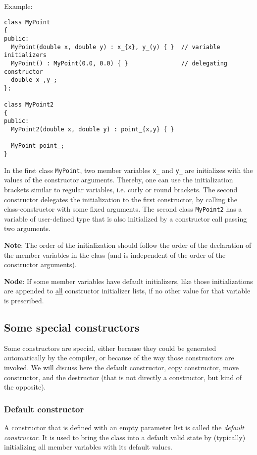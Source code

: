 Example:
\begin{verbatim}
class MyPoint
{
public:
  MyPoint(double x, double y) : x_{x}, y_(y) { }  // variable initializers
  MyPoint() : MyPoint(0.0, 0.0) { }               // delegating constructor
  double x_,y_;
};

class MyPoint2
{
public:
  MyPoint2(double x, double y) : point_{x,y} { }

  MyPoint point_;
}
\end{verbatim}
%
In the first class \texttt{MyPoint}, two member variables \texttt{x\_} and \texttt{y\_} are initializes with the values of the constructor arguments. Thereby,
one can use the initialization brackets similar to regular variables, i.e. curly or round brackets. The second constructor delegates the initialization to
the first constructor, by calling the class-constructor with some fixed arguments. The second class \texttt{MyPoint2} has a variable of user-defined type
that is also initialized by a constructor call passing two arguments.

\textbf{Note}: The order of the initialization should follow the order of the declaration of the member variables in the class (and is independent of the order
of the constructor arguments).

\textbf{Node}: If some member variables have default initializers, like  those initializations are appended to \underline{all} constructor
initializer lists, if no other value for that variable is prescribed.


\subsection{Some special constructors}
Some constructors are special, either because they could be generated automatically by the compiler, or because of the way those constructors are invoked. We
will discuss here the default constructor, copy constructor, move constructor, and the destructor (that is not directly a constructor, but kind of the opposite).


\subsubsection{Default constructor}
A constructor that is defined with an empty parameter list is called the \emph{default constructor}. It is used to bring the class into a default valid state
by (typically) initializing all member variables with its default values.


